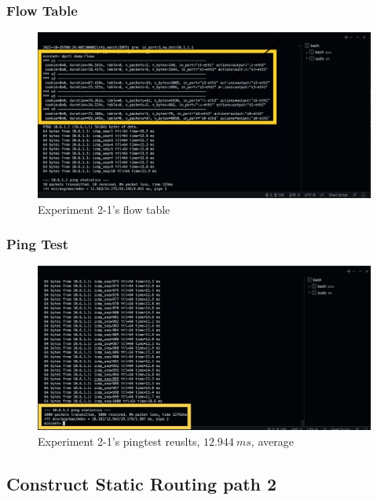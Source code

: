 \subsubsection*{Flow Table}
\begin{figure}[!h]\centering 
	\includegraphics[width=.99\textwidth]{image/week08/2-1-1.png}
	\caption{\footnotesize
	 Experiment 2-1’s flow table}
	\vspace{-10pt}
\end{figure}
\clearpage
\subsubsection*{Ping Test}
\begin{figure}[!h]\centering 
	\includegraphics[width=.99\textwidth]{image/week08/2-1-2.png}
	\caption{\footnotesize
	 Experiment 2-1’s pingtest reuslts, $12.944\ ms$, average}
	\vspace{-10pt}
\end{figure}
\subsection{Construct Static Routing path 2}
